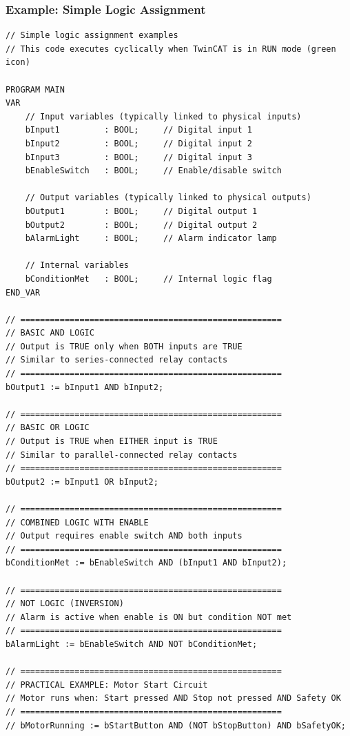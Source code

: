 \documentclass[11pt,a4paper]{article}
\begin{document}
\subsubsection*{Example: Simple Logic Assignment}

\begin{lstlisting}
// Simple logic assignment examples
// This code executes cyclically when TwinCAT is in RUN mode (green icon)

PROGRAM MAIN
VAR
    // Input variables (typically linked to physical inputs)
    bInput1         : BOOL;     // Digital input 1
    bInput2         : BOOL;     // Digital input 2
    bInput3         : BOOL;     // Digital input 3
    bEnableSwitch   : BOOL;     // Enable/disable switch
    
    // Output variables (typically linked to physical outputs)
    bOutput1        : BOOL;     // Digital output 1
    bOutput2        : BOOL;     // Digital output 2
    bAlarmLight     : BOOL;     // Alarm indicator lamp
    
    // Internal variables
    bConditionMet   : BOOL;     // Internal logic flag
END_VAR

// =====================================================
// BASIC AND LOGIC
// Output is TRUE only when BOTH inputs are TRUE
// Similar to series-connected relay contacts
// =====================================================
bOutput1 := bInput1 AND bInput2;

// =====================================================
// BASIC OR LOGIC  
// Output is TRUE when EITHER input is TRUE
// Similar to parallel-connected relay contacts
// =====================================================
bOutput2 := bInput1 OR bInput2;

// =====================================================
// COMBINED LOGIC WITH ENABLE
// Output requires enable switch AND both inputs
// =====================================================
bConditionMet := bEnableSwitch AND (bInput1 AND bInput2);

// =====================================================
// NOT LOGIC (INVERSION)
// Alarm is active when enable is ON but condition NOT met
// =====================================================
bAlarmLight := bEnableSwitch AND NOT bConditionMet;

// =====================================================
// PRACTICAL EXAMPLE: Motor Start Circuit
// Motor runs when: Start pressed AND Stop not pressed AND Safety OK
// =====================================================
// bMotorRunning := bStartButton AND (NOT bStopButton) AND bSafetyOK;
\end{lstlisting}
\end{document}
